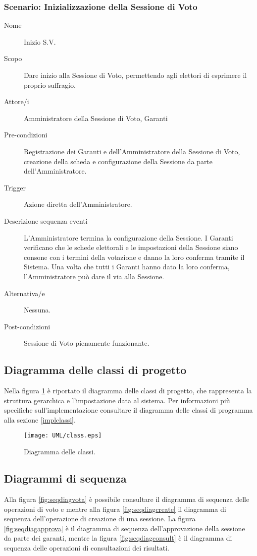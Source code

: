 \subsubsection{Scenario: Inizializzazione della Sessione di Voto}
\begin{description}
	\item[Nome] Inizio S.V.
	\item[Scopo] Dare inizio alla Sessione di Voto, permettendo agli elettori di esprimere il proprio suffragio.
	\item[Attore/i] Amministratore della Sessione di Voto, Garanti
	\item[Pre-condizioni] Registrazione dei Garanti e dell'Amministratore della Sessione di Voto, creazione della scheda e configurazione della Sessione da parte dell'Amministratore.
	\item[Trigger] Azione diretta dell'Amministratore.
	\item[Descrizione sequenza eventi] L'Amministratore termina la configurazione della Sessione. I Garanti verificano che le schede elettorali e le impostazioni della Sessione siano consone con i termini della votazione e danno la loro conferma tramite il Sistema. Una volta che tutti i Garanti hanno dato la loro conferma, l'Amministratore può dare il via alla Sessione.
	\item[Alternativa/e] Nessuna.
	\item[Post-condizioni] Sessione di Voto pienamente funzionante.
\end{description}


\subsection{Diagramma delle classi di progetto}
\label{subsec:projclassdiag}
Nella figura \ref{fig:classdiag} è riportato il diagramma delle classi di progetto, che rappresenta la struttura gerarchica e l'impostazione data al sistema. Per informazioni più specifiche sull'implementazione consultare il diagramma delle classi di programma alla sezione \ref{implclassi}.
\begin{figure}[ht]
	\centering
	\texttt{[image: UML/class.eps]}
	\caption{Diagramma delle classi.}
	\label{fig:classdiag}
\end{figure}



\subsection{Diagrammi di sequenza}
Alla figura \ref{fig:seqdiagvota} è possibile consultare il diagramma di sequenza delle operazioni di voto e mentre alla figura \ref{fig:seqdiagcreate} il diagramma di sequenza dell'operazione di creazione di una sessione.
La figura \ref{fig:seqdiagapprova} è il diagramma di sequenza dell'approvazione della sessione da parte dei garanti, mentre la figura \ref{fig:seqdiagconsult} è il diagramma di sequenza delle operazioni di consultazioni dei risultati.


